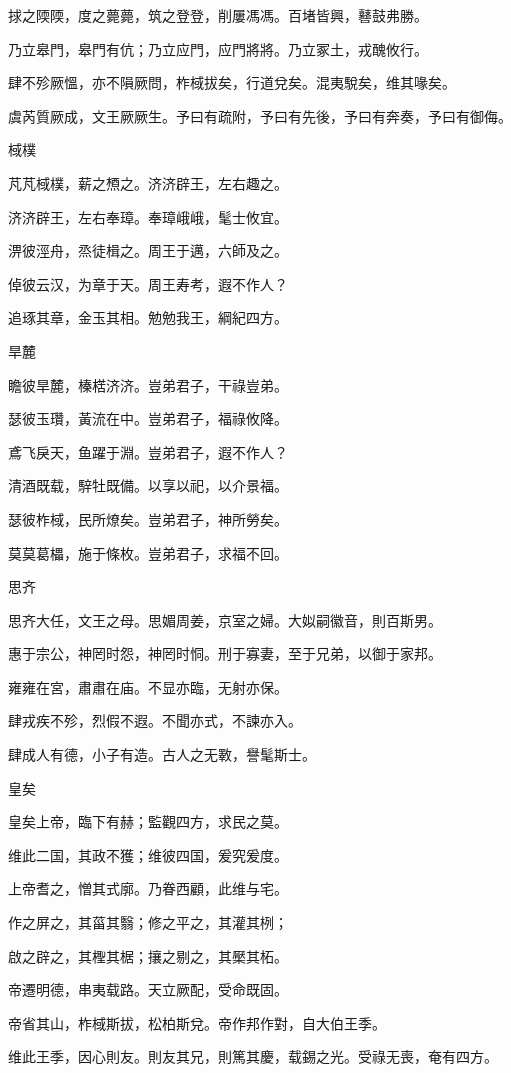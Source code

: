 捄之陾陾，度之薨薨，筑之登登，削屢馮馮。百堵皆興，鼛鼓弗勝。

乃立皋門，皋門有伉；乃立应門，应門將將。乃立冢土，戎醜攸行。

肆不殄厥慍，亦不隕厥問，柞棫拔矣，行道兌矣。混夷駾矣，维其喙矣。

虞芮質厥成，文王厥厥生。予曰有疏附，予曰有先後，予曰有奔奏，予曰有御侮。

棫樸

芃芃棫樸，薪之槱之。济济辟王，左右趣之。

济济辟王，左右奉璋。奉璋峨峨，髦士攸宜。

淠彼涇舟，烝徒楫之。周王于邁，六師及之。

倬彼云汉，为章于天。周王寿考，遐不作人？

追琢其章，金玉其相。勉勉我王，綱紀四方。

旱麓

瞻彼旱麓，榛楛济济。豈弟君子，干祿豈弟。

瑟彼玉瓚，黃流在中。豈弟君子，福祿攸降。

鳶飞戾天，鱼躍于淵。豈弟君子，遐不作人？

清酒既载，騂牡既備。以享以祀，以介景福。

瑟彼柞棫，民所燎矣。豈弟君子，神所勞矣。

莫莫葛櫑，施于條枚。豈弟君子，求福不回。

思齐

思齐大任，文王之母。思媚周姜，京室之婦。大姒嗣徽音，則百斯男。

惠于宗公，神罔时怨，神罔时恫。刑于寡妻，至于兄弟，以御于家邦。

雍雍在宮，肅肅在庙。不显亦臨，无射亦保。

肆戎疾不殄，烈假不遐。不聞亦式，不諫亦入。

肆成人有德，小子有造。古人之无斁，譽髦斯士。

皇矣

皇矣上帝，臨下有赫；監觀四方，求民之莫。

维此二国，其政不獲；维彼四国，爰究爰度。

上帝耆之，憎其式廓。乃眷西顧，此维与宅。

作之屏之，其菑其翳；修之平之，其灌其栵；

啟之辟之，其檉其椐；攘之剔之，其檿其柘。

帝遷明德，串夷载路。天立厥配，受命既固。

帝省其山，柞棫斯拔，松柏斯兌。帝作邦作對，自大伯王季。

维此王季，因心則友。則友其兄，則篤其慶，载錫之光。受祿无喪，奄有四方。

